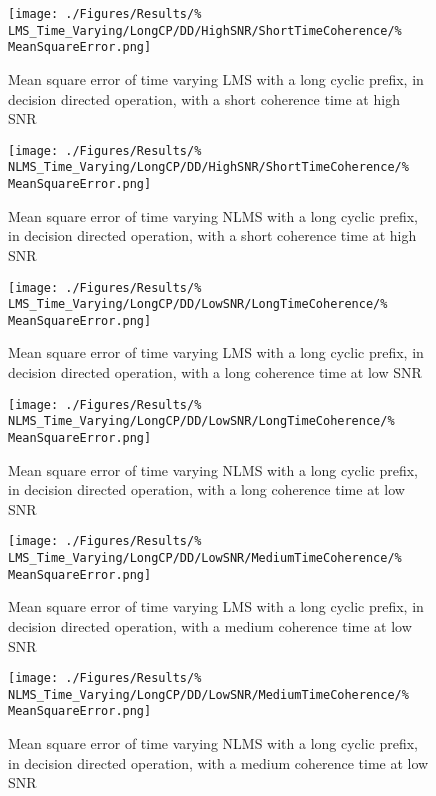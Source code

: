 \begin{figure}[ht]
	\centering
	\begin{minipage}{0.49\textwidth}
		\centering
		\texttt{[image: ./Figures/Results/\%
	LMS\_Time\_Varying/LongCP/DD/HighSNR/ShortTimeCoherence/\%
	MeanSquareError.png]}
		\captionsetup{width=0.75\linewidth}
		\caption{Mean square error of time varying LMS with a 
		long cyclic prefix, in decision directed operation,
		with a short coherence time at high SNR}
	\end{minipage}
	\begin{minipage}{0.49\textwidth}
		\centering
		\texttt{[image: ./Figures/Results/\%
	NLMS\_Time\_Varying/LongCP/DD/HighSNR/ShortTimeCoherence/\%
	MeanSquareError.png]}
		\captionsetup{width=0.75\linewidth}
		\caption{Mean square error of time varying NLMS with 
		a long cyclic prefix, in decision directed operation,
		with a short coherence time at high SNR}
		\label{fig:NLMS-Short-High-Directed-Long}
	\end{minipage}
\end{figure}

\begin{figure}[ht]
	\begin{minipage}{0.49\textwidth}
		\texttt{[image: ./Figures/Results/\%
	LMS\_Time\_Varying/LongCP/DD/LowSNR/LongTimeCoherence/\%
	MeanSquareError.png]}
		\captionsetup{width=0.75\linewidth}
		\caption{Mean square error of time varying LMS with a 
		long cyclic prefix, in decision directed operation,
		with a long coherence time at low SNR}
	\end{minipage}
	\begin{minipage}{0.49\textwidth}
		\texttt{[image: ./Figures/Results/\%
	NLMS\_Time\_Varying/LongCP/DD/LowSNR/LongTimeCoherence/\%
	MeanSquareError.png]}
		\captionsetup{width=0.75\linewidth}
		\caption{Mean square error of time varying NLMS with 
		a long cyclic prefix, in decision directed operation,
		with a long coherence time at low SNR}
	\end{minipage}
\end{figure}

\begin{figure}[ht]
	\centering
	\begin{minipage}{0.49\textwidth}
		\centering
		\texttt{[image: ./Figures/Results/\%
	LMS\_Time\_Varying/LongCP/DD/LowSNR/MediumTimeCoherence/\%
	MeanSquareError.png]}
		\captionsetup{width=0.75\linewidth}
		\caption{Mean square error of time varying LMS with a 
		long cyclic prefix, in decision directed operation, 
		with a medium coherence time at low SNR}
	\end{minipage}
	\begin{minipage}{0.49\textwidth}
		\centering
		\texttt{[image: ./Figures/Results/\%
	NLMS\_Time\_Varying/LongCP/DD/LowSNR/MediumTimeCoherence/\%
	MeanSquareError.png]}
		\captionsetup{width=0.75\linewidth}
		\caption{Mean square error of time varying NLMS with 
		a long cyclic prefix, in decision directed operation,
		with a medium coherence time at low SNR}
	\end{minipage}
\end{figure}

